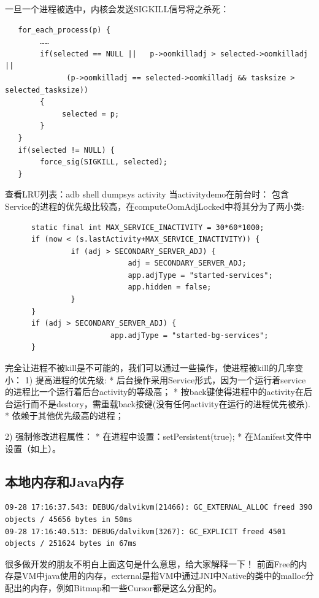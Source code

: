 \documentclass[a4paper, 11pt]{article}
\begin{document}
一旦一个进程被选中，内核会发送SIGKILL信号将之杀死：
\begin{lstlisting}
   for_each_process(p) {
        ……
        if(selected == NULL ||   p->oomkilladj > selected->oomkilladj ||
              (p->oomkilladj == selected->oomkilladj && tasksize > selected_tasksize))
        {
             selected = p;
        }
   }
   if(selected != NULL) {
        force_sig(SIGKILL, selected);
   }
\end{lstlisting}
 
查看LRU列表：adb shell dumpsys activity
当activitydemo在前台时： 
包含Service的进程的优先级比较高，在computeOomAdjLocked中将其分为了两小类:
\begin{lstlisting}
      static final int MAX_SERVICE_INACTIVITY = 30*60*1000;                 
      if (now < (s.lastActivity+MAX_SERVICE_INACTIVITY)) {
               if (adj > SECONDARY_SERVER_ADJ) {
                            adj = SECONDARY_SERVER_ADJ;
                            app.adjType = "started-services";
                            app.hidden = false;
               }
      }
      if (adj > SECONDARY_SERVER_ADJ) {
                        app.adjType = "started-bg-services";
      }
\end{lstlisting}
 

完全让进程不被kill是不可能的，我们可以通过一些操作，使进程被kill的几率变小：
  1) 提高进程的优先级:
        * 后台操作采用Service形式，因为一个运行着service的进程比一个运行着后台activity的等级高；
        * 按back键使得进程中的activity在后台运行而不是destory，需重载back按键(没有任何activity在运行的进程优先被杀).
        * 依赖于其他优先级高的进程；

  2) 强制修改进程属性：
        * 在进程中设置：setPersistent(true);
        * 在Manifest文件中设置（如上）。

\subsection{本地内存和Java内存}
\begin{lstlisting}
09-28 17:16:37.543: DEBUG/dalvikvm(21466): GC_EXTERNAL_ALLOC freed 390 objects / 45656 bytes in 50ms
09-28 17:16:40.513: DEBUG/dalvikvm(3267): GC_EXPLICIT freed 4501 objects / 251624 bytes in 67ms
\end{lstlisting}

很多做开发的朋友不明白上面这句是什么意思，给大家解释一下！
前面Free的内存是VM中java使用的内存，external是指VM中通过JNI中Native的类中的malloc分配出的内存，例如Bitmap和一些Cursor都是这么分配的。
\end{document}
